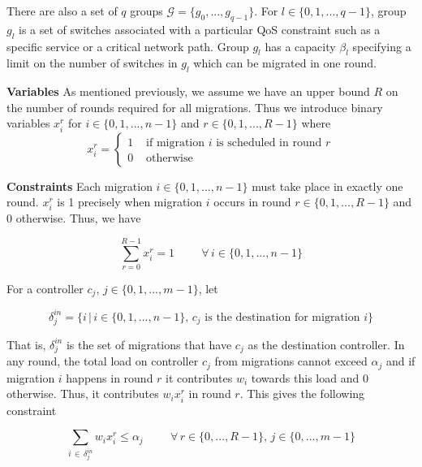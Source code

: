 \documentclass[letterpaper,12pt,titlepage,oneside,final]{article}
\begin{document}
There are also a set of $q$ groups $\mathcal{G} = \{g_{0}, ..., g_{q-1}\}$. For $l \in \{0, 1, ..., q - 1\}$, group $g_{l}$ is a set of switches associated with a particular QoS constraint such as a specific service or a critical network path. Group $g_{l}$ has a capacity $\beta_{l}$ specifying a limit on the number of switches in $g_{l}$ which can be migrated in one round.

\noindent\textbf{Variables}\newline
\noindent As mentioned previously, we assume we have an upper bound $R$ on the number of rounds required for all migrations. Thus we introduce binary variables $x^{r}_{i}$ for $i \in \{0, 1, ..., n - 1\}$ and $r \in \{0, 1, ..., R - 1\}$ where
\[
    x^{r}_{i} =
    \begin{cases}
        1 &\text{ if migration } i \text { is scheduled in round } r \\
        0 &\text{ otherwise}
    \end{cases}
\]

\noindent\textbf{Constraints}\newline
\noindent Each migration $i \in \{0, 1, ..., n - 1\}$ must take place in exactly one round. $x^{r}_{i}$ is 1 precisely when migration $i$ occurs in round $r \in \{0, 1, ..., R-1\}$ and 0 otherwise. Thus, we have

\begin{equation}\label{eq:single-migration}
    \sum_{r=0}^{R-1} x^{r}_{i} = 1 \hspace{1cm} \forall \, i \in \{0, 1, ..., n - 1\}
\end{equation}

\noindent For a controller $c_{j}$, $j \in \{0, 1, ..., m - 1\}$, let 

$$\delta^{in}_{j} = \{i \, | \, i \in \{0, 1, ..., n-1\}, \, c_{j} \text{ is the destination for migration } i\}$$

That is, $\delta^{in}_{j}$ is the set of migrations that have $c_{j}$ as the destination controller. In any round, the total load on controller $c_{j}$ from migrations cannot exceed $\alpha_{j}$ and if migration $i$ happens in round $r$ it contributes $w_{i}$ towards this load and 0 otherwise. Thus, it contributes $w_{i}x^{r}_{i}$ in round $r$. This gives the following constraint

\begin{equation}\label{eq:controller-simple}
    \sum_{i \, \in \, \delta^{in}_{j}} w_{i}x^{r}_{i} \leq \alpha_{j} \hspace{1cm} \forall \, r \in \{0, ..., R-1\}, \, j \in \{0, ..., m-1\}
\end{equation}
\end{document}
